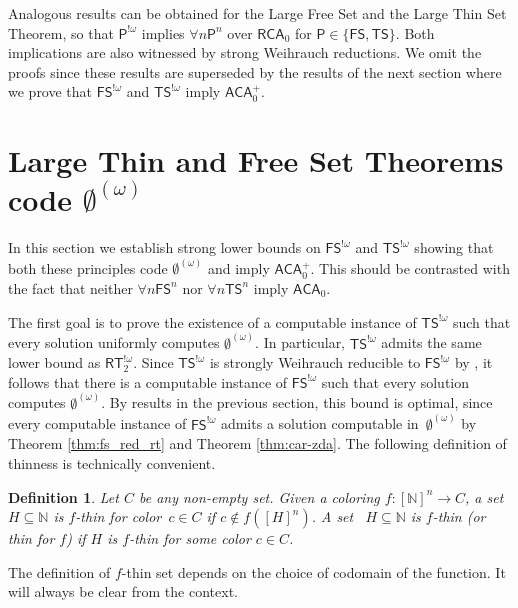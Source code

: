 \documentclass[10pt,a4paper]{article}
\newcommand{\Psf}{\mathsf{P}}
\newcommand{\RCA}[0]{\mathsf{RCA}}
\newcommand{\ACA}[0]{\mathsf{ACA}}
\newcommand{\FS}[0]{\mathsf{FS}}
\newcommand{\TS}[0]{\mathsf{TS}}
\newcommand{\RT}[0]{\mathsf{RT}}
\newcommand{\NN}[0]{\mathbb{N}}
\numberwithin{theorem}{section}
\newtheorem{definition}[theorem]{Definition}
\begin{document}
Analogous results can be obtained for the Large Free Set and the Large Thin Set Theorem, so that $\Psf^{!\omega}$ implies $\forall n \Psf^n$ over $\RCA_0$ for $\Psf\in\{\FS,\TS\}$. Both implications are also witnessed by strong Weihrauch reductions. We omit the proofs since these results are superseded by the results of the next section where we prove that $\FS^{!\omega}$ and $\TS^{!\omega}$ imply $\ACA_0^+$.


\section{Large Thin and Free Set Theorems code $\emptyset^{(\omega)}$}\label{sec:ts_fs_lowerbd}

In this section we establish strong lower bounds on $\FS^{!\omega}$ 
and $\TS^{!\omega}$ showing that both these principles code $\emptyset^{(\omega)}$ and imply $\ACA_0^+$. This should be contrasted with the fact that neither $\forall n \FS^n$ nor $\forall n \TS^n$ imply $\ACA_0$.

The first goal is to prove the existence of a computable instance of $\TS^{!\omega}$ such that every solution uniformly computes $\emptyset^{(\omega)}$. In particular, $\TS^{!\omega}$ admits the same lower bound as $\RT^{!\omega}_2$. Since $\TS^{!\omega}$ is strongly Weihrauch reducible to $\FS^{!\omega}$ by , it follows that there is a computable instance of $\FS^{!\omega}$ such that every solution computes $\emptyset^{(\omega)}$. 
By results in the previous section, this bound is optimal, since every computable instance of $\FS^{!\omega}$ admits a solution computable in~$\emptyset^{(\omega)}$ by Theorem \ref{thm:fs_red_rt} and Theorem \ref{thm:car-zda}. The following definition of thinness is technically convenient. 

\begin{definition}
Let $C$ be any non-empty set. Given a coloring $f : [\NN]^n \to C$, a set~$H \subseteq \NN$ is \emph{$f$-thin for color~$c \in C$} if $c \not \in f([H]^n)$. A set ~$H \subseteq \NN$ is $f$-thin (or thin for $f$) if $H$ is $f$-thin for some color $c\in C$.
\end{definition}

The definition of $f$-thin set depends on the choice of codomain of the function. It will always be clear from the context. 

\end{document}

